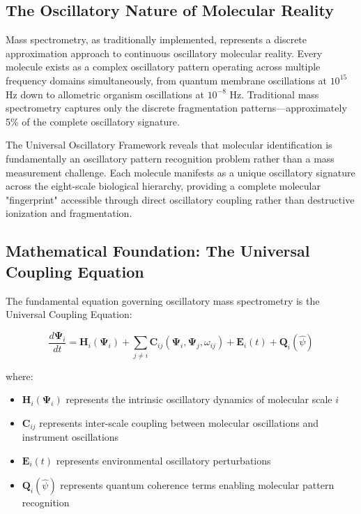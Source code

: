 \documentclass[12pt,a4paper]{article}
\begin{document}
\subsection{The Oscillatory Nature of Molecular Reality}

Mass spectrometry, as traditionally implemented, represents a discrete approximation approach to continuous oscillatory molecular reality. Every molecule exists as a complex oscillatory pattern operating across multiple frequency domains simultaneously, from quantum membrane oscillations at $10^{15}$ Hz down to allometric organism oscillations at $10^{-8}$ Hz. Traditional mass spectrometry captures only the discrete fragmentation patterns—approximately 5\% of the complete oscillatory signature.

The Universal Oscillatory Framework reveals that molecular identification is fundamentally an oscillatory pattern recognition problem rather than a mass measurement challenge. Each molecule manifests as a unique oscillatory signature across the eight-scale biological hierarchy, providing a complete molecular "fingerprint" accessible through direct oscillatory coupling rather than destructive ionization and fragmentation.

\subsection{Mathematical Foundation: The Universal Coupling Equation}

The fundamental equation governing oscillatory mass spectrometry is the Universal Coupling Equation:

\begin{equation}
\frac{d\mathbf{\Psi}_i}{dt} = \mathbf{H}_i(\mathbf{\Psi}_i) + \sum_{j \neq i} \mathbf{C}_{ij}(\mathbf{\Psi}_i, \mathbf{\Psi}_j, \omega_{ij}) + \mathbf{E}_i(t) + \mathbf{Q}_i(\hat{\psi})
\label{eq:universal_coupling}
\end{equation}

where:
\begin{itemize}
\item $\mathbf{H}_i(\mathbf{\Psi}_i)$ represents the intrinsic oscillatory dynamics of molecular scale $i$
\item $\mathbf{C}_{ij}$ represents inter-scale coupling between molecular oscillations and instrument oscillations
\item $\mathbf{E}_i(t)$ represents environmental oscillatory perturbations
\item $\mathbf{Q}_i(\hat{\psi})$ represents quantum coherence terms enabling molecular pattern recognition
\end{itemize}
\end{document}
